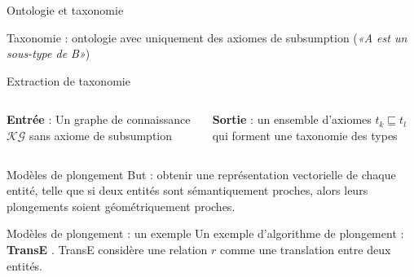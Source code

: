 \documentclass{beamer}
\begin{document}
\begin{frame}{Ontologie et taxonomie}

Taxonomie : ontologie avec uniquement des axiomes de subsumption (\textit{«A est un sous-type de B»})

\begin{figure}[H]
    \centering
    
\end{figure}
\end{frame}

\begin{frame}{Extraction de taxonomie}

\begin{columns}[t]
    \begin{column}{0.48\textwidth}
        \textbf{Entrée} : 
        Un graphe de connaissance $\mathcal{KG}$ sans axiome de subsumption
        
        \begin{figure}
            
        \end{figure}
    \end{column}
    \begin{column}{0.4\textwidth}
        \textbf{Sortie} : un ensemble d'axiomes $t_k \sqsubseteq t_l$ qui forment une taxonomie des types
        \begin{figure}
            
        \end{figure}
    \end{column}
\end{columns}

\end{frame}

\begin{frame}{Modèles de plongement}
    But : obtenir une représentation vectorielle de chaque entité, telle que si deux entités sont sémantiquement proches, alors leurs plongements soient géométriquement proches.
    
    \begin{figure}
        
    \end{figure}
    
\end{frame}

\begin{frame}{Modèles de plongement : un exemple}
    Un exemple d'algorithme de plongement : \textbf{TransE} \cite{bordes2013translating}.
    \newline \newline
    TransE considère une relation $r$ comme une translation entre deux entités.

    \begin{figure}[H]
        \centering
        
    \end{figure}
\end{frame}
\end{document}
